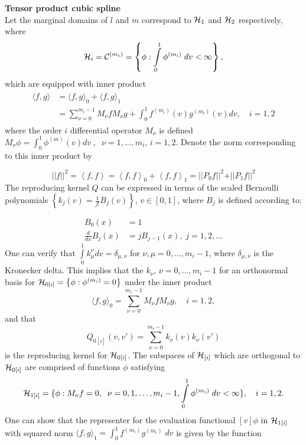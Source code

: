 \begin{example}{\textbf {Tensor product cubic spline}}\\
\vspace{0.5cm}
Let the marginal domains of $l$ and $m$ correspond to $\mathcal{H}_1$ and $\mathcal{H}_2$ respectively, where
\[
\mathcal{H}_i = \mathcal{C}^{\left(m_i\right)} = \left\{ \phi: \int \limits_{0}^1 \phi^{\left(m_i\right)}\;dv < \infty  \right\},
\]
\noindent
which are equipped with inner product
\begin{align}
\begin{split}
\langle f,g\rangle &= \langle f,g\rangle_0 + \langle f,g\rangle_1\\
 &= \sum_{\nu=0}^{m_i-1}M_{\nu} f M_{\nu} g + \int_0^1 f^{\left( m_i \right)}\left(v\right)g^{\left( m_i \right)}\left(v\right)dv, \quad i = 1,2
\end{split}
\end{align}
\noindent
where the order $i$ differential operator $M_\nu$ is defined $M_\nu \phi = \int_0^1 \phi^{\left( m \right)}\left(v\right) dv\;,\;\; \nu = 1, \dots, m_i$, $i = 1,2$. Denote the norm corresponding to this inner product by

\[
\vert \vert f \vert \vert^2 = \left< f,f\right> = \left< f,f\right>_0 + \left< f,f\right>_1 = \vert \vert P_0 f \vert \vert^2 + \vert \vert P_1 f \vert \vert^2
\]
\noindent
The reproducing kernel $Q$ can be expressed in terms of the scaled Bernoulli polynomials $\left\{ k_j\left(v\right) = \frac{1}{j!}B_j\left(v\right) \right\}$, $v \in \left[0,1\right]$, where $B_j$ is defined according to:

\begin{align*}
B_0\left(x\right) &= 1\\
\frac{d}{dx} B_j\left(x\right) &= jB_{j-1}\left(x\right), \;j = 1, 2, \dots
\end{align*}
\noindent
One can verify that $\int \limits_0^1 k_\mu^\nu dv = \delta_{\mu,\nu}$ for $\nu, \mu= 0,\dots, m_i -1$, where $\delta_{\mu,\nu}$ is the Kronecker delta. This implies that the $k_\nu$, $\nu = 0,\dots, m_i-1$ for an orthonormal basis for $\mathcal{H}_{0\left[i\right]} = \left\{ \phi: \phi^{\left( m_i \right)} = 0 \right\}$ under the inner product
\[
\langle f,g\rangle_0 =  \sum_{\nu=0}^{m_i-1}M_{\nu} f M_{\nu} g, \quad i = 1, 2, 
\]
\noindent
and that 
\[
Q_{0\left[i\right]}\left(v,v'\right) = \sum_{\nu=0}^{m_i-1}  k_\nu\left(v\right)  k_\nu\left(v'\right) 
\]
\noindent
is the reproducing kernel for $\mathcal{H}_{0\left[i\right]}$. The subspaces of $\mathcal{H}_{\left[i\right]}$ which are orthogonal to $\mathcal{H}_{0\left[i\right]}$ are comprised of functions $\phi$ satisfying 
\[
\mathcal{H}_{1\left[i\right]} = \lbrace \phi: M_\nu f = 0,\;\; \nu = 0,1,\dots, m_i-1,\int\limits_{0}^1 \phi^{\left(m_i\right)}\;dv < \infty \rbrace, \quad i = 1,2.
\]
One can show that the representer for the evaluation functional $\left[v\right] \phi$ in $\mathcal{H}_{1\left[i\right]}$ with squared norm $\langle f,g\rangle_1= \int_0^1 f^{\left(m_i\right)}g^{\left(m_i\right)}\;dv$ is given by the function


\end{example}
